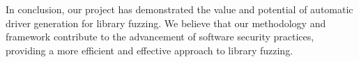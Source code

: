 \documentclass[a4paper,11pt,oneside]{report}
\begin{document}
In conclusion, our project has demonstrated the value and potential 
of automatic driver generation for library fuzzing. We believe that 
our methodology and framework contribute to the advancement of 
software security practices, providing a more efficient and effective 
approach to library fuzzing.

\cleardoublepage
{}
{}
\printbibliography

%
%
\end{document}
